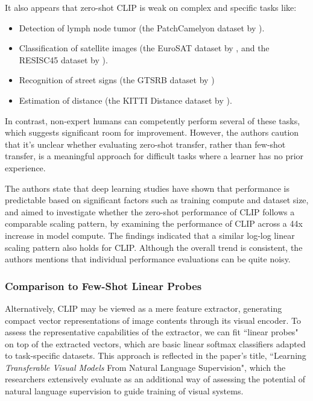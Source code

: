 \documentclass{article}
\begin{document}
\medskip
\noindent
It also appears that zero-shot CLIP is weak on complex and specific tasks like:
\begin{itemize}
    \item
        Detection of lymph node tumor (the PatchCamelyon dataset by  \citet{veeling2018rotation}).
    \item
        Classification of satellite images (the EuroSAT dataset by \citet{helber2019eurosat}, and the RESISC45 dataset by \citet{cheng2017remote}).
    \item
        Recognition of street signs (the GTSRB dataset by \citet{stallkamp2011german})
    \item
        Estimation of distance (the KITTI Distance dataset by \citet{geiger2012we}).
\end{itemize}
In contrast, non-expert humans can competently perform several of these tasks, which suggests significant room for improvement. However, the authors caution that it's unclear whether evaluating zero-shot transfer, rather than few-shot transfer, is a meaningful approach for difficult tasks where a learner has no prior experience.

\medskip
\noindent
The authors state that deep learning studies have shown that performance is predictable based on significant factors such as training compute and dataset size, and aimed to investigate whether the zero-shot performance of CLIP follows a comparable scaling pattern, by examining the performance of CLIP across a 44x increase in model compute. The findings indicated that a similar log-log linear scaling pattern also holds for CLIP. Although the overall trend is consistent, the authors mentions that individual performance evaluations can be quite noisy.


\subsubsection{Comparison to Few-Shot Linear Probes}
\label{subsec:clip-linear-probes}

\medskip
\noindent
Alternatively, CLIP may be viewed as a mere feature extractor, generating compact vector representations of image contents through its visual encoder. To assess the representative capabilities of the extractor, we can fit ``linear probes" on top of the extracted vectors, which are basic linear softmax classifiers adapted to task-specific datasets. This approach is reflected in the paper's title, ``Learning \emph{Transferable Visual Models} From Natural Language Supervision", which the researchers extensively evaluate as an additional way of assessing the potential of natural language supervision to guide training of visual systems.
\end{document}
